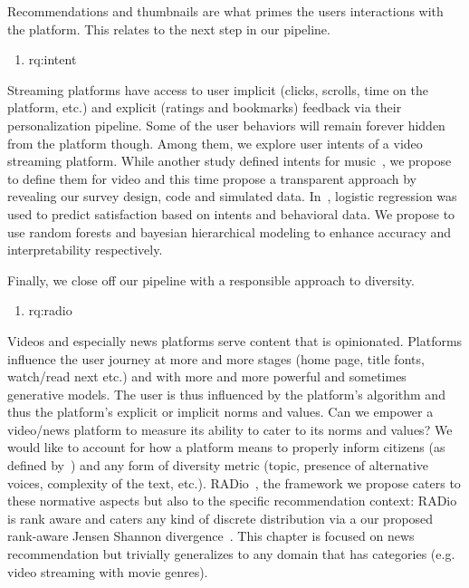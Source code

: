 Recommendations and thumbnails are what primes the users interactions with the platform. This relates to the next step in our pipeline.
%
%
\begin{enumerate}[label=\textbf{RQ\arabic*},ref={RQ\arabic*},resume,leftmargin=*]
	\item \acl{rq:intent}\label{rq:intent}
  \end{enumerate}
%
Streaming platforms have access to user implicit (clicks, scrolls, time on the platform, etc.) and explicit (ratings and bookmarks) feedback via their personalization pipeline. Some of the user behaviors will remain forever hidden from the platform though. Among them, we explore user intents of a video streaming platform. While another study defined intents for music~\cite{spotifyIntent}, we propose to define them for video and this time propose a transparent approach by revealing our survey design, code and simulated data. In~\cite{spotifyIntent}, logistic regression was used to predict satisfaction based on intents and behavioral data. We propose to use random forests and bayesian hierarchical modeling to enhance accuracy and interpretability respectively.

Finally, we close off our pipeline with a responsible approach to diversity.
%
%
\begin{enumerate}[label=\textbf{RQ\arabic*},ref={RQ\arabic*},resume,leftmargin=*]
	\item \acl{rq:radio}\label{rq:radio}
\end{enumerate}
%
Videos and especially news platforms serve content that is opinionated. Platforms influence the user journey at more and more stages (home page, title fonts, watch/read next etc.) and with more and more powerful and sometimes generative models. The user is thus influenced by the platform's algorithm and thus the platform's explicit or implicit norms and values. Can we empower a video/news platform to measure its ability to cater to its norms and values? We would like to account for how a platform means to properly inform citizens (as defined by~\cite{helberger}) and any form of diversity metric (topic, presence of alternative voices, complexity of the text, etc.). RADio~\cite{radio}, the framework we propose caters to these normative aspects but also to the specific recommendation context: RADio is rank aware and caters any kind of discrete distribution via a our proposed rank-aware Jensen Shannon divergence~\cite{js}. This chapter is focused on news recommendation but trivially generalizes to any domain that has categories (e.g. video streaming with movie genres).

